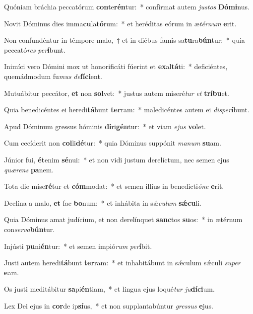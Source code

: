 \item Quóniam bráchia peccatórum \textbf{con}te\textbf{rén}tur:~* confírmat autem \textit{jus}\textit{tos} \textbf{Dó}\textbf{mi}nus.
\item Novit Dóminus dies imma\textbf{cu}la\textbf{tó}rum:~* et heréditas eórum in æ\textit{tér}\textit{num} \textbf{e}rit.
\item Non confundéntur in témpore malo,~† et in diébus famis sa\textbf{tu}ra\textbf{bún}tur:~* quia peccató\textit{res} \textit{per}\textbf{í}bunt.
\item Inimíci vero Dómini mox ut honorificáti fúerint et \textbf{ex}al\textbf{tá}ti:~* deficiéntes, quemádmodum fu\textit{mus} \textit{de}\textbf{fí}\textbf{ci}ent.
\item Mutuábitur peccátor, \textbf{et} non \textbf{sol}vet:~* justus autem miseré\textit{tur} \textit{et} \textbf{trí}\textbf{bu}et.
\item Quia benedicéntes ei heredi\textbf{tá}bunt \textbf{ter}ram:~* maledicéntes autem ei \textit{dis}\textit{per}\textbf{í}bunt.
\item Apud Dóminum gressus hóminis \textbf{di}ri\textbf{gén}tur:~* et viam \textit{e}\textit{jus} \textbf{vo}let.
\item Cum cecíderit non \textbf{col}li\textbf{dé}tur:~* quia Dóminus suppónit \textit{ma}\textit{num} \textbf{su}am.
\item Júnior fui, \textbf{ét}enim \textbf{sé}nui:~* et non vidi justum derelíctum, nec semen ejus \textit{quæ}\textit{rens} \textbf{pa}nem.
\item Tota die mise\textbf{ré}tur et \textbf{cóm}modat:~* et semen illíus in benedicti\textit{ó}\textit{ne} \textbf{e}rit.
\item Declína a malo, \textbf{et} fac \textbf{bo}num:~* et inhábita in sǽ\textit{cu}\textit{lum} \textbf{sǽ}\textbf{cu}li.
\item Quia Dóminus amat judícium, et non derelínquet \textbf{sanc}tos \textbf{su}os:~* in ætérnum con\textit{ser}\textit{va}\textbf{bún}tur.
\item Injústi \textbf{pu}ni\textbf{én}tur:~* et semen impió\textit{rum} \textit{per}\textbf{í}bit.
\item Justi autem heredi\textbf{tá}bunt \textbf{ter}ram:~* et inhabitábunt in sǽculum sǽculi \textit{su}\textit{per} \textbf{e}am.
\item Os justi meditábitur \textbf{sa}pi\textbf{én}tiam,~* et lingua ejus loqué\textit{tur} \textit{ju}\textbf{dí}\textbf{ci}um.
\item Lex Dei ejus in \textbf{cor}de ip\textbf{sí}us,~* et non supplantabúntur \textit{gres}\textit{sus} \textbf{e}jus.

